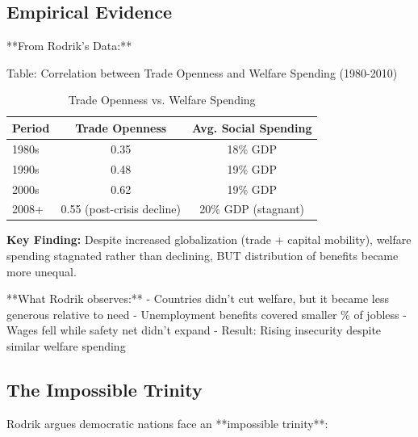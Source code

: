 \subsection{Empirical Evidence}

**From Rodrik's Data:**

Table: Correlation between Trade Openness and Welfare Spending (1980-2010)

\begin{table}[h]
\centering
\caption{Trade Openness vs. Welfare Spending}
\label{tab:rodrik-openness}
\begin{tabular}{lcc}
\toprule
\textbf{Period} & \textbf{Trade Openness} & \textbf{Avg. Social Spending} \\
\midrule
1980s & 0.35 & 18\% GDP \\
1990s & 0.48 & 19\% GDP \\
2000s & 0.62 & 19\% GDP \\
2008+ & 0.55 (post-crisis decline) & 20\% GDP (stagnant) \\
\bottomrule
\end{tabular}
\end{table}

\textbf{Key Finding:} Despite increased globalization (trade + capital mobility), welfare spending stagnated rather than declining, BUT distribution of benefits became more unequal.

**What Rodrik observes:**
- Countries didn't cut welfare, but it became less generous relative to need
- Unemployment benefits covered smaller \% of jobless
- Wages fell while safety net didn't expand
- Result: Rising insecurity despite similar welfare spending

\subsection{The Impossible Trinity}

Rodrik argues democratic nations face an **impossible trinity**:

